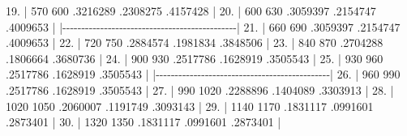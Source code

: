 \documentclass[
  12pt,
  letterpaper,
  DIV=11,
  numbers=noendperiod,
  onepage,
  openany]{scrreprt}
\newenvironment{Shaded}{\begin{snugshade}}{\end{snugshade}}
\newcommand{\DecValTok}[1]{\textcolor[rgb]{0.86,0.86,0.80}{#1}}
\newcommand{\ErrorTok}[1]{\textcolor[rgb]{0.76,0.75,0.62}{#1}}
\newcommand{\FloatTok}[1]{\textcolor[rgb]{0.75,0.75,0.82}{#1}}
\newcommand{\NormalTok}[1]{\textcolor[rgb]{0.80,0.80,0.80}{#1}}
\newcommand{\SpecialCharTok}[1]{\textcolor[rgb]{0.86,0.64,0.64}{#1}}
\begin{document}
\begin{Shaded}
\begin{Highlighting}[]
 \FloatTok{19.} \SpecialCharTok{|}  \DecValTok{570}    \DecValTok{600}\NormalTok{   .}\DecValTok{3216289}\NormalTok{   .}\DecValTok{2308275}\NormalTok{   .}\DecValTok{4157428} \SpecialCharTok{|}
 \FloatTok{20.} \SpecialCharTok{|}  \DecValTok{600}    \DecValTok{630}\NormalTok{   .}\DecValTok{3059397}\NormalTok{   .}\DecValTok{2154747}\NormalTok{   .}\DecValTok{4009653} \SpecialCharTok{|}
     \ErrorTok{|}\SpecialCharTok{{-}{-}{-}{-}{-}{-}{-}{-}{-}{-}{-}{-}{-}{-}{-}{-}{-}{-}{-}{-}{-}{-}{-}{-}{-}{-}{-}{-}{-}{-}{-}{-}{-}{-}{-}{-}{-}{-}{-}{-}{-}{-}{-}{-}{-}{-}}\ErrorTok{|}
 \FloatTok{21.} \SpecialCharTok{|}  \DecValTok{660}    \DecValTok{690}\NormalTok{   .}\DecValTok{3059397}\NormalTok{   .}\DecValTok{2154747}\NormalTok{   .}\DecValTok{4009653} \SpecialCharTok{|}
 \FloatTok{22.} \SpecialCharTok{|}  \DecValTok{720}    \DecValTok{750}\NormalTok{   .}\DecValTok{2884574}\NormalTok{   .}\DecValTok{1981834}\NormalTok{   .}\DecValTok{3848506} \SpecialCharTok{|}
 \FloatTok{23.} \SpecialCharTok{|}  \DecValTok{840}    \DecValTok{870}\NormalTok{   .}\DecValTok{2704288}\NormalTok{   .}\DecValTok{1806664}\NormalTok{   .}\DecValTok{3680736} \SpecialCharTok{|}
 \FloatTok{24.} \SpecialCharTok{|}  \DecValTok{900}    \DecValTok{930}\NormalTok{   .}\DecValTok{2517786}\NormalTok{   .}\DecValTok{1628919}\NormalTok{   .}\DecValTok{3505543} \SpecialCharTok{|}
 \FloatTok{25.} \SpecialCharTok{|}  \DecValTok{930}    \DecValTok{960}\NormalTok{   .}\DecValTok{2517786}\NormalTok{   .}\DecValTok{1628919}\NormalTok{   .}\DecValTok{3505543} \SpecialCharTok{|}
     \ErrorTok{|}\SpecialCharTok{{-}{-}{-}{-}{-}{-}{-}{-}{-}{-}{-}{-}{-}{-}{-}{-}{-}{-}{-}{-}{-}{-}{-}{-}{-}{-}{-}{-}{-}{-}{-}{-}{-}{-}{-}{-}{-}{-}{-}{-}{-}{-}{-}{-}{-}{-}}\ErrorTok{|}
 \FloatTok{26.} \SpecialCharTok{|}  \DecValTok{960}    \DecValTok{990}\NormalTok{   .}\DecValTok{2517786}\NormalTok{   .}\DecValTok{1628919}\NormalTok{   .}\DecValTok{3505543} \SpecialCharTok{|}
 \FloatTok{27.} \SpecialCharTok{|}  \DecValTok{990}   \DecValTok{1020}\NormalTok{   .}\DecValTok{2288896}\NormalTok{   .}\DecValTok{1404089}\NormalTok{   .}\DecValTok{3303913} \SpecialCharTok{|}
 \FloatTok{28.} \SpecialCharTok{|} \DecValTok{1020}   \DecValTok{1050}\NormalTok{   .}\DecValTok{2060007}\NormalTok{   .}\DecValTok{1191749}\NormalTok{   .}\DecValTok{3093143} \SpecialCharTok{|}
 \FloatTok{29.} \SpecialCharTok{|} \DecValTok{1140}   \DecValTok{1170}\NormalTok{   .}\DecValTok{1831117}\NormalTok{   .}\DecValTok{0991601}\NormalTok{   .}\DecValTok{2873401} \SpecialCharTok{|}
 \FloatTok{30.} \SpecialCharTok{|} \DecValTok{1320}   \DecValTok{1350}\NormalTok{   .}\DecValTok{1831117}\NormalTok{   .}\DecValTok{0991601}\NormalTok{   .}\DecValTok{2873401} \SpecialCharTok{|}

\end{Highlighting}
\end{Shaded}
\end{document}
